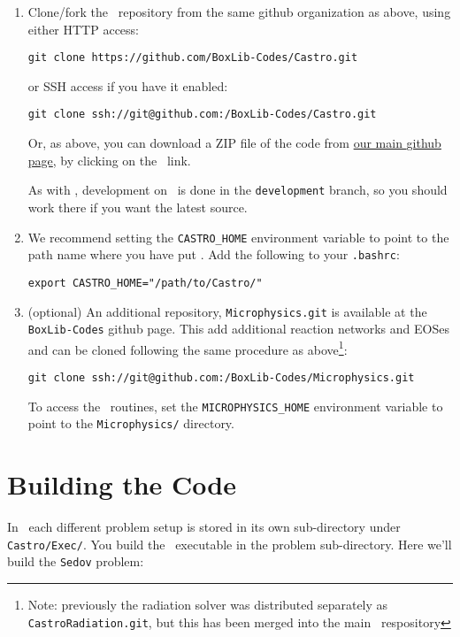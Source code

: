 \begin{enumerate}
\item Clone/fork the \castro\ repository from the same {\sf
  github} organization as above, using either HTTP access:
\begin{verbatim}
git clone https://github.com/BoxLib-Codes/Castro.git
\end{verbatim}
or SSH access if you have it enabled:
\begin{verbatim}
git clone ssh://git@github.com:/BoxLib-Codes/Castro.git
\end{verbatim}
Or, as above, you can download a ZIP file of the code from
\href{https://github.com/BoxLib-Codes}{our main {\sf github} page},
by clicking on the \castro\ link.

As with \boxlib, development on \castro\ is done in the
{\tt development} branch, so you should work there if you want
the latest source.

\item We recommend setting the {\tt CASTRO\_HOME} environment
  variable to point to the path name where you have put \castro.
  Add the following to your {\tt .bashrc}:
\begin{verbatim}
export CASTRO_HOME="/path/to/Castro/"
\end{verbatim}


\item (optional) An additional repository, {\tt Microphysics.git} is
  available at the {\tt BoxLib-Codes} github page.  This add
  additional reaction networks and EOSes and can be cloned following
  the same procedure as above\footnote{Note: previously the radiation
    solver was distributed separately as {\tt CastroRadiation.git},
    but this has been merged into the main \castro\ respository}:
\begin{verbatim}
git clone ssh://git@github.com:/BoxLib-Codes/Microphysics.git
\end{verbatim}

To access the \microphysics\ routines, set the {\tt MICROPHYSICS\_HOME}
environment variable to point to the {\tt Microphysics/} directory.

\end{enumerate}


\section{Building the Code}

In \castro\ each different problem setup is stored in its own
sub-directory under {\tt Castro/Exec/}.  You build the
\castro\ executable in the problem sub-directory.  Here we'll
build the {\tt Sedov} problem:

